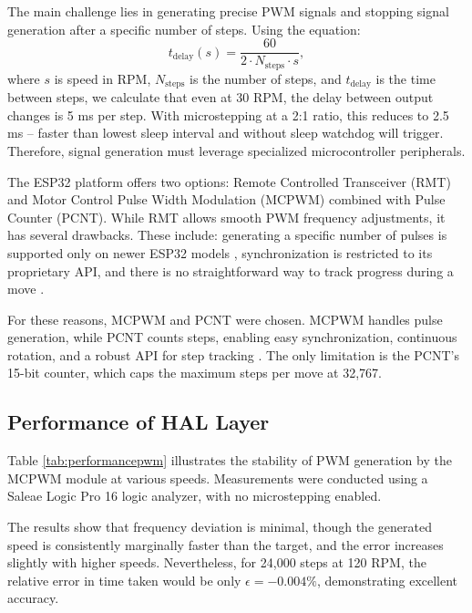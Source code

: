The main challenge lies in generating precise PWM signals and stopping signal generation after a specific number of steps.
Using the equation:
%
\begin{equation}
  t_{\mathrm{delay}}(s) = \frac{60}{2\cdot N_{\mathrm{steps}} \cdot s},
  \label{eq:delay}
\end{equation}
%
where $s$ is speed in RPM, $N_{\mathrm{steps}}$ is the number of steps, and $t_{\mathrm{delay}}$ is the time between steps, we calculate that even at 30 RPM, the delay between output changes is 5 ms per step.
With microstepping at a 2:1 ratio, this reduces to 2.5 ms -- faster than lowest sleep interval and without sleep watchdog will trigger.
Therefore, signal generation must leverage specialized microcontroller peripherals.

The ESP32 platform offers two options: Remote Controlled Transceiver (RMT) and Motor Control Pulse Width Modulation (MCPWM) combined with Pulse Counter (PCNT).
While RMT allows smooth PWM frequency adjustments, it has several drawbacks.
These include: generating a specific number of pulses is supported only on newer ESP32 models \cite{gitRMT}, synchronization is restricted to its proprietary API, and there is no straightforward way to track progress during a move \cite{espRMT}.

For these reasons, MCPWM and PCNT were chosen.
MCPWM handles pulse generation, while PCNT counts steps, enabling easy synchronization, continuous rotation, and a robust API for step tracking \cite{espPCNT}.
The only limitation is the PCNT’s 15-bit counter, which caps the maximum steps per move at 32,767.


\subsection{Performance of HAL Layer}


Table \ref{tab:performancepwm} illustrates the stability of PWM generation by the MCPWM module at various speeds.
Measurements were conducted using a Saleae Logic Pro 16 logic analyzer, with no microstepping enabled.

The results show that frequency deviation is minimal, though the generated speed is consistently marginally faster than the target, and  the error increases slightly with higher speeds.
Nevertheless, for 24,000 steps at 120 RPM, the relative error in time taken would be only $\epsilon = -0.004\%$, demonstrating excellent accuracy.



